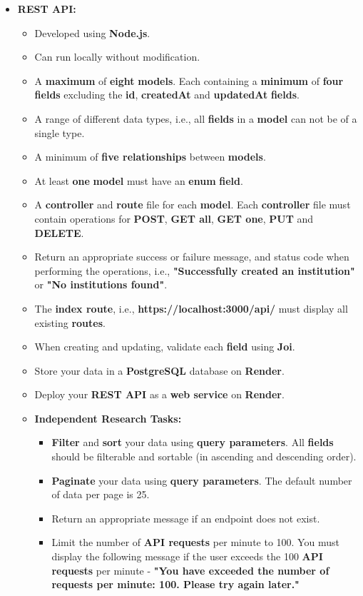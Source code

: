 \documentclass{article}
\begin{document}
\begin{itemize} 
	\item \textbf{REST API:}
	\begin{itemize}
		\item Developed using \textbf{Node.js}.
		\item Can run locally without modification.
		\item A \textbf{maximum} of \textbf{eight} \textbf{models}. Each containing a \textbf{minimum} of \textbf{four} \textbf{fields} excluding the \textbf{id}, \textbf{createdAt} and \textbf{updatedAt} \textbf{fields}.
		\item A range of different data types, i.e., all \textbf{fields} in a \textbf{model} can not be of a single type.
		\item A minimum of \textbf{five relationships} between \textbf{models}.
		\item At least \textbf{one} \textbf{model} must have an \textbf{enum} \textbf{field}. 
		\item A \textbf{controller} and \textbf{route} file for each \textbf{model}. Each \textbf{controller} file must contain operations for \textbf{POST}, \textbf{GET all}, \textbf{GET one}, \textbf{PUT} and \textbf{DELETE}.
		\item Return an appropriate success or failure message, and status code when performing the operations, i.e., \textbf{"Successfully created an institution"} or \textbf{"No institutions found"}.
		\item The \textbf{index route}, i.e., \textbf{https://localhost:3000/api/} must display all existing \textbf{routes}.
		\item When creating and updating, validate each \textbf{field} using \textbf{Joi}. 
		\item Store your data in a \textbf{PostgreSQL} database on \textbf{Render}.
		\item Deploy your \textbf{REST API} as a \textbf{web service} on \textbf{Render}.
		\item \textbf{Independent Research Tasks:} 
		\begin{itemize}
			\item \textbf{Filter} and \textbf{sort} your data using \textbf{query parameters}. All \textbf{fields} should be filterable and sortable (in ascending and descending order).
			\item \textbf{Paginate} your data using \textbf{query parameters}. The default number of data per page is 25.
			\item Return an appropriate message if an endpoint does not exist.
			\item Limit the number of \textbf{API requests} per minute to 100. You must display the following message if the user exceeds the 100 \textbf{API requests} per minute - \textbf{"You have exceeded the number of requests per minute: 100. Please try again later."}
		\end{itemize}
	\end{itemize}


\end{itemize}
\end{document}
